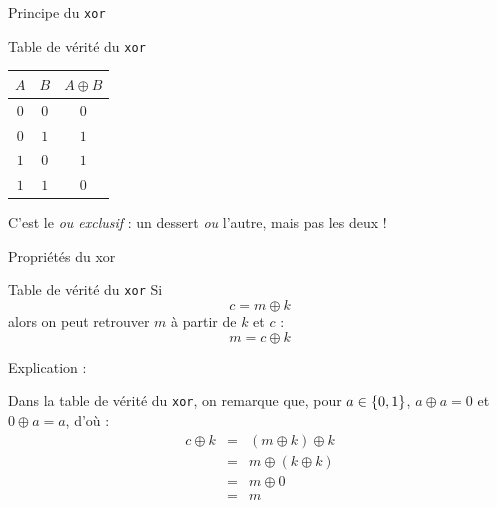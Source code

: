 \documentclass{beamer}
\begin{document}
    \begin{frame}{Principe du \texttt{xor}}%
        \begin{block}{Table de vérité du \texttt{xor}}%
            \begin{center}
                \begin{tabular}{|c|c||c|}
                    \hline
                    $A$ & $B$ & $A \oplus B$
                    \\
                    \hline
                    \hline
                    $0$ & $0$ & $0$
                    \\
                    \hline
                    $0$ & $1$ & $1$
                    \\
                    \hline
                    $1$ & $0$ & $1$
                    \\
                    \hline
                    $1$ & $1$ & $0$
                    \\
                    \hline
                \end{tabular}
            \end{center}
        \end{block}%

        C'est le \emph{ou exclusif} : un dessert \emph{ou} l'autre, mais pas les deux !
    \end{frame}%

    \begin{frame}{Propriétés du xor}%
        \begin{block}{Table de vérité du \texttt{xor}}%
            Si
            \[
                c = m \oplus k
            \]
            alors on peut retrouver $m$ à partir de $k$ et $c$ :
            \[
                m = c \oplus k
            \]
        \end{block}%

        \vspace{12pt}
        
        Explication :

        Dans la table de vérité du \texttt{xor}, on remarque que, pour $a \in \left\{ 0, 1 \right\}$, $\boxed{a \oplus a = 0}$ et $\boxed{0 \oplus a = a}$, d'où :
        \[
            \begin{array}{rcl}
                c \oplus k
                &=&
                (m \oplus k) \oplus k
                \\
                &=&
                m \oplus (k \oplus k)
                \\
                &=&
                m \oplus 0
                \\
                &=& m
            \end{array}
        \]
    \end{frame}%
\end{document}

